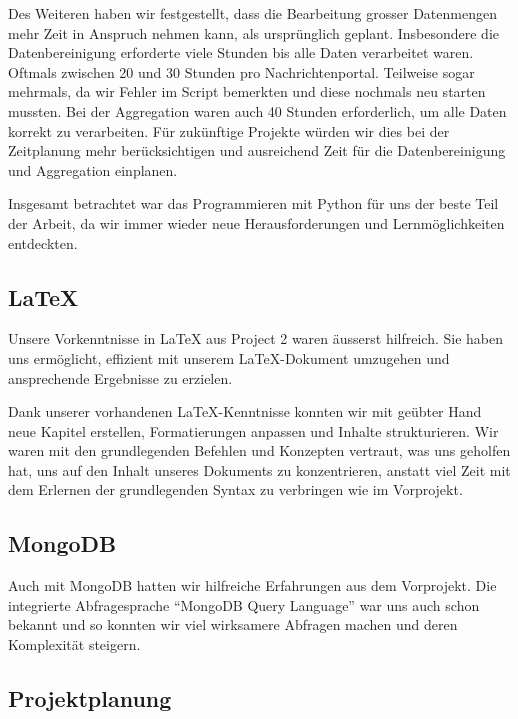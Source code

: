 Des Weiteren haben wir festgestellt, dass die Bearbeitung grosser Datenmengen mehr Zeit in Anspruch nehmen kann, als ursprünglich geplant. 
Insbesondere die Datenbereinigung erforderte viele Stunden bis alle Daten verarbeitet waren. 
Oftmals zwischen 20 und 30 Stunden pro Nachrichtenportal. 
Teilweise sogar mehrmals, da wir Fehler im Script bemerkten und diese nochmals neu starten mussten.
Bei der Aggregation waren auch 40 Stunden erforderlich, um alle Daten korrekt zu verarbeiten. 
Für zukünftige Projekte würden wir dies bei der Zeitplanung mehr berücksichtigen und ausreichend Zeit für die Datenbereinigung und Aggregation einplanen.

Insgesamt betrachtet war das Programmieren mit Python für uns der beste Teil der Arbeit, da wir immer wieder neue Herausforderungen und Lernmöglichkeiten entdeckten. 

\subsection{LaTeX}

Unsere Vorkenntnisse in LaTeX aus Project 2 waren äusserst hilfreich. 
Sie haben uns ermöglicht, effizient mit unserem LaTeX-Dokument umzugehen und ansprechende Ergebnisse zu erzielen.

Dank unserer vorhandenen LaTeX-Kenntnisse konnten wir mit geübter Hand neue Kapitel erstellen, Formatierungen anpassen und Inhalte strukturieren. 
Wir waren mit den grundlegenden Befehlen und Konzepten vertraut, was uns geholfen hat, uns auf den Inhalt unseres 
Dokuments zu konzentrieren, anstatt viel Zeit mit dem Erlernen der grundlegenden Syntax zu verbringen wie im Vorprojekt.

\subsection{MongoDB}
Auch mit MongoDB hatten wir hilfreiche Erfahrungen aus dem Vorprojekt.
Die integrierte Abfragesprache \enquote{MongoDB Query Language} war uns auch schon bekannt und so konnten wir viel wirksamere Abfragen machen und
deren Komplexität steigern.

\subsection{Projektplanung}

